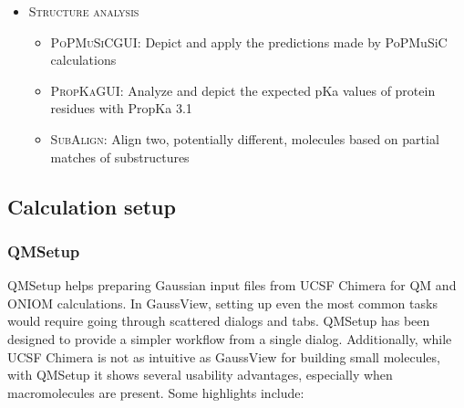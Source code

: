 \begin{itemize}
	\item \textsc{Structure analysis}

	\begin{itemize}
		\item \textsc{PoPMuSiCGUI}: Depict and apply the predictions made by PoPMuSiC calculations

		\item \textsc{PropKaGUI}: Analyze and depict the expected pKa values of protein residues with PropKa 3.1

		\item \textsc{SubAlign}: Align two, potentially different, molecules based on partial matches of substructures
	\end{itemize}
\end{itemize}


%

\subsection{Calculation setup}
\subsubsection{QMSetup}
QMSetup helps preparing Gaussian input files from UCSF Chimera for QM and ONIOM calculations. In GaussView, setting up even the most common tasks would require going through scattered dialogs and tabs. QMSetup has been designed to provide a simpler workflow from a single dialog. Additionally, while UCSF Chimera is not as intuitive as GaussView for building small molecules, with QMSetup it shows several usability advantages, especially when macromolecules are present. Some highlights include:


